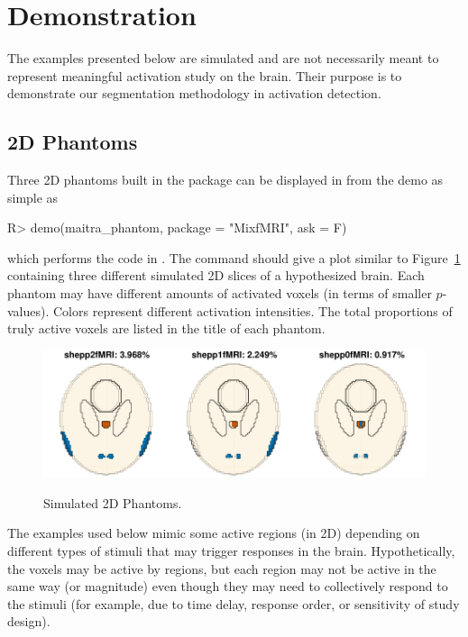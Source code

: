 \section[Demonstration]{Demonstration}
\label{sec:demonstrations}
The examples presented below are simulated and are not necessarily
meant to represent meaningful activation study on the brain. Their
purpose is to demonstrate our segmentation methodology in activation
detection. 


\subsection[2D Phantoms]{2D Phantoms}
\label{sec:phantoms}

Three 2D phantoms built in the  package can be displayed in
from the demo as simple as
\begin{Code}[title=Maitra's Phantoms]
R> demo(maitra_phantom, package = "MixfMRI", ask = F)
\end{Code}
which performs the code in .
The 
command should give a plot similar to Figure~\ref{fig:maitra_phantom}
containing three different simulated 2D slices of a hypothesized brain.
Each phantom may have different amounts of activated voxels (in terms
of smaller $p$-values). Colors represent different activation intensities.
The total proportions of truly active voxels are listed in the title of
each phantom.
\begin{figure}[h]
\caption{Simulated 2D Phantoms.}
\centering
\vspace{0.2cm}
\includegraphics[width=6in]{./MixfMRI-include/maitra_phantom}
\label{fig:maitra_phantom}
\end{figure}

The examples used below mimic some active regions (in 2D)
depending on different types of stimuli that may trigger responses
in the brain.
Hypothetically, the voxels may be active by regions, but
each region may not be active in the same way (or magnitude) even
though they may need to collectively respond to the stimuli (for example, due
to time delay, response order, or sensitivity of study design).

